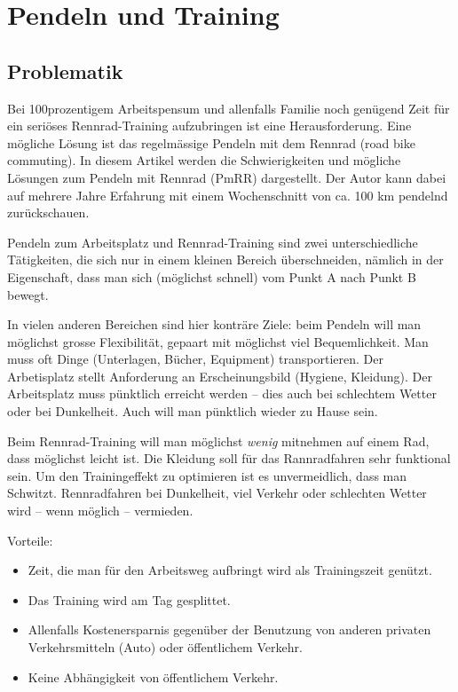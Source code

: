 \chapter{Pendeln und Training}


\section{Problematik}

Bei 100prozentigem Arbeitspensum und allenfalls Familie noch genügend Zeit
für ein seriöses Rennrad-Training aufzubringen ist eine Herausforderung.
Eine mögliche Lösung ist das regelmässige Pendeln mit dem Rennrad (road
bike commuting). In diesem Artikel werden die Schwierigkeiten und mögliche
Lösungen zum Pendeln mit Rennrad (PmRR) dargestellt. Der Autor kann dabei
auf mehrere Jahre Erfahrung mit einem Wochenschnitt von ca. 100 km pendelnd
zurückschauen.

Pendeln zum Arbeitsplatz und Rennrad-Training sind zwei unterschiedliche
Tätigkeiten, die sich nur in einem kleinen Bereich überschneiden, nämlich
in der Eigenschaft, dass man sich (möglichst schnell) vom Punkt A nach Punkt
B bewegt.

In vielen anderen Bereichen sind hier konträre Ziele: beim Pendeln will man
möglichst grosse Flexibilität, gepaart mit möglichst viel Bequemlichkeit.
Man muss oft Dinge (Unterlagen, Bücher, Equipment) transportieren. Der
Arbetisplatz stellt Anforderung an Erscheinungsbild (Hygiene, Kleidung). Der
Arbeitsplatz muss pünktlich erreicht werden -- dies auch bei schlechtem
Wetter oder bei Dunkelheit. Auch will man pünktlich wieder zu Hause sein.

Beim Rennrad-Training will man möglichst \emph{wenig} mitnehmen auf einem
Rad, dass möglichst leicht ist. Die Kleidung soll für das Rannradfahren sehr
funktional sein. Um den Trainingeffekt zu optimieren ist es unvermeidlich,
dass man Schwitzt. Rennradfahren bei Dunkelheit, viel Verkehr oder schlechten
Wetter wird -- wenn möglich -- vermieden.

Vorteile:
\begin{itemize}
        \item Zeit, die man für den Arbeitsweg aufbringt wird als Trainingszeit genützt.
        \item Das Training wird am Tag gesplittet.
        \item Allenfalls Kostenersparnis gegenüber der Benutzung von anderen privaten Verkehrsmitteln (Auto) oder öffentlichem Verkehr.
        \item Keine Abhängigkeit von öffentlichem Verkehr.
\end{itemize}
